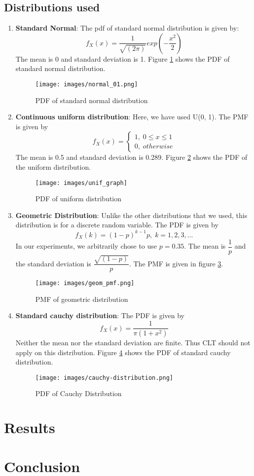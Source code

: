 \documentclass{article}
\begin{document}
\subsection{Distributions used}
\begin{enumerate}
    \item \textbf{Standard Normal}: The pdf of standard normal distribution is given by:
    $$f_X(x) = \dfrac{1}{\sqrt{(2\pi)}}exp(-\dfrac{x^2}{2})$$
    The mean is 0 and standard deviation is 1. Figure \ref{normal_pdf} shows the PDF of standard normal distribution.
    \begin{figure}[h]
        \centering
        \texttt{[image: images/normal\_01.png]}
        \caption{PDF of standard normal distribution}
        \label{normal_pdf}
    \end{figure}
    \item \textbf{Continuous uniform distribution}: Here, we have used U(0, 1). The PMF is given by $$f_X(x) = \begin{cases}1,\; 0 \le x \le 1 \\ 0,\; otherwise\end{cases}$$ 
    The mean is 0.5 and standard deviation is 0.289. Figure \ref{uni_pdf} shows the PDF of the uniform distribution.
    \begin{figure}[h]
        \centering
        \texttt{[image: images/unif\_graph]}
        \caption{PDF of uniform distribution}
        \label{uni_pdf}
    \end{figure}
    \item \textbf{Geometric Distribution}: Unlike the other distributions that we used, this distribution is for a discrete random variable. The PDF is given by
    $$f_X(k) = (1-p)^{k-1}p,\; k=1,2,3,...$$
    In our experiments, we arbitrarily chose to use $p=0.35$. The mean is $\dfrac{1}{p}$ and the standard deviation is $\dfrac{\sqrt{(1-p)}}{p}$. The PMF is given in figure \ref{geom_pmf}. 
    \begin{figure}[h]
        \centering
        \texttt{[image: images/geom\_pmf.png]}
        \caption{PMF of geometric distribution}
        \label{geom_pmf}
    \end{figure}
    \item \textbf{Standard cauchy distribution}: The PDF is given by $$f_X(x) = \dfrac{1}{\pi (1+x^2)}$$ Neither the mean nor the standard deviation are finite. Thus CLT should not apply on this distribution. Figure \ref{cauchy_pdf} shows the PDF of standard cauchy distribution.
    \begin{figure}[h]
        \centering
        \texttt{[image: images/cauchy-distribution.png]}
        \caption{PDF of Cauchy Distribution}
        \label{cauchy_pdf}
    \end{figure}
\end{enumerate}

\section{Results}
\section{Conclusion}
\end{document}
